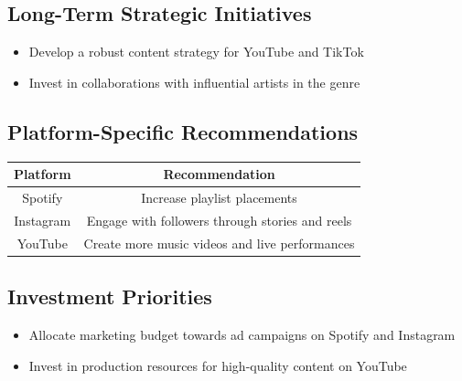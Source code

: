 \documentclass{report}
\begin{document}
\subsection{Long-Term Strategic Initiatives}

\begin{itemize}
    \item Develop a robust content strategy for YouTube and TikTok
    \item Invest in collaborations with influential artists in the genre
\end{itemize}

\subsection{Platform-Specific Recommendations}

\begin{tabular}{|c|c|}
    \hline
    \textbf{Platform} & \textbf{Recommendation} \\
    \hline
    Spotify & Increase playlist placements \\
    Instagram & Engage with followers through stories and reels \\
    YouTube & Create more music videos and live performances \\
    \hline
\end{tabular}

\subsection{Investment Priorities}

\begin{itemize}
    \item Allocate marketing budget towards ad campaigns on Spotify and Instagram
    \item Invest in production resources for high-quality content on YouTube
\end{itemize}
\end{document}
